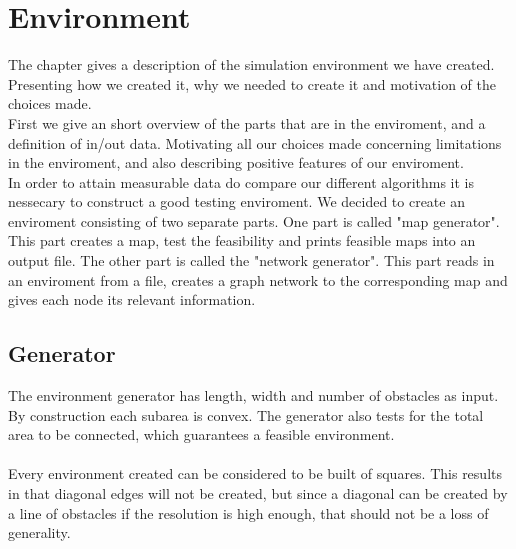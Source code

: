 \chapter{Environment}
The chapter gives a description of the simulation environment we have created. Presenting how we created it, why we needed to create it and motivation of the choices made.\\
First we give an short overview of the parts that are in the enviroment, and a definition of in/out data. Motivating all our choices made concerning limitations in the enviroment, and also describing positive features of our enviroment.
\\
In order to attain measurable data do compare our different algorithms it is nessecary to construct a good testing enviroment. We decided to create an enviroment consisting of two separate parts. One part is called "map generator". This part creates a map, test the feasibility and prints feasible maps into an output file. The other part is called the "network generator". This part reads in an enviroment from a file, creates a graph network to the corresponding map and gives each node its relevant information. 
\\
\section{Generator}
The environment generator has length, width and number of obstacles as input. By construction each subarea is convex. The generator also tests for the total area to be connected, which guarantees a feasible environment.\\
\\
Every environment created can be considered to be built of squares. This results in that diagonal edges will not be created, but since a diagonal can be created by a line of obstacles if the resolution is high enough, that should not be a loss of generality. \\
\\
\\
